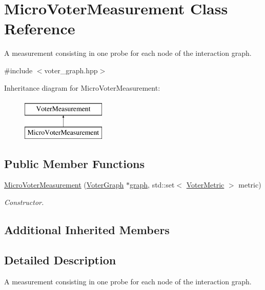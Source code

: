 \hypertarget{classMicroVoterMeasurement}{\section{Micro\-Voter\-Measurement Class Reference}
\label{classMicroVoterMeasurement}
}


A measurement consisting in one probe for each node of the interaction graph.  




{\ttfamily \#include $<$voter\-\_\-graph.\-hpp$>$}

Inheritance diagram for Micro\-Voter\-Measurement\-:\begin{figure}[H]
\begin{center}
\leavevmode
\includegraphics[height=2.000000cm]{classMicroVoterMeasurement}
\end{center}
\end{figure}
\subsection*{Public Member Functions}
\begin{DoxyCompactItemize}
\item 
\hyperlink{classMicroVoterMeasurement_a5ab772e26666d7ddf100a0cfea95afee}{Micro\-Voter\-Measurement} (\hyperlink{classVoterGraph}{Voter\-Graph} $\ast$\hyperlink{classVoterMeasurement_a8d22d4b78f7e2f4c747f5716c4885351}{graph}, std\-::set$<$ \hyperlink{voter__graph_8hpp_acb4c45a5ce4a55eee28e54e60409b9c5}{Voter\-Metric} $>$ metric)
\begin{DoxyCompactList}\small\item\em Constructor. \end{DoxyCompactList}\end{DoxyCompactItemize}
\subsection*{Additional Inherited Members}


\subsection{Detailed Description}
A measurement consisting in one probe for each node of the interaction graph. 

